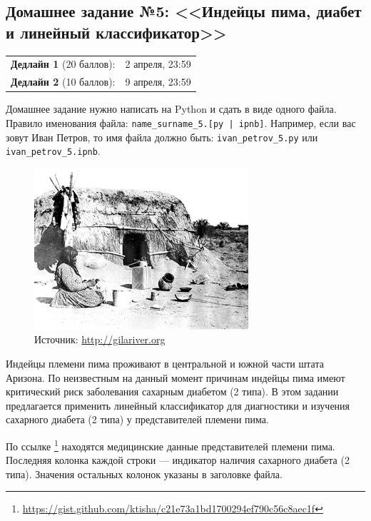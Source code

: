 \documentclass[a4paper,12pt]{article}
\begin{document}
\subsection*{Домашнее задание №5: <<Индейцы пима, диабет и линейный классификатор>>}

\begin{tabular}{@{}lr}
  \textbf{Дедлайн 1} (20 баллов): & 2 апреля, 23:59 \\
  \textbf{Дедлайн 2} (10 баллов): & 9 апреля, 23:59 \\
\end{tabular}

Домашнее задание нужно написать на Python и сдать в виде одного файла.
Правило именования файла: \texttt{name\_surname\_5.[py | ipnb]}. Например, если
вас зовут Иван Петров, то имя файла должно быть: \texttt{ivan\_petrov\_5.py} или \texttt{ivan\_petrov\_5.ipnb}.

\makebox[\linewidth]{\hrulefill}

\begin{figure}[h!]
  \centering
  \includegraphics[width=.4\linewidth]{images/pima}
  \caption{Источник: \url{http://gilariver.org}}
\end{figure}

Индейцы племени пима проживают в центральной и южной части штата Аризона. По
неизвестным на данный момент причинам индейцы пима имеют критический риск
заболевания сахарным диабетом (2 типа). В этом задании предлагается применить
линейный классификатор для диагностики и изучения сахарного диабета (2 типа) у
представителей племени пима.

По ссылке%
\footnote{\url{https://gist.github.com/ktisha/c21e73a1bd1700294ef790c56c8aec1f}}
находятся медицинские данные представителей племени пима. Последняя колонка
каждой строки --- индикатор наличия сахарного диабета (2 типа). Значения
остальных колонок указаны в заголовке файла.

\pagebreak
\end{document}
